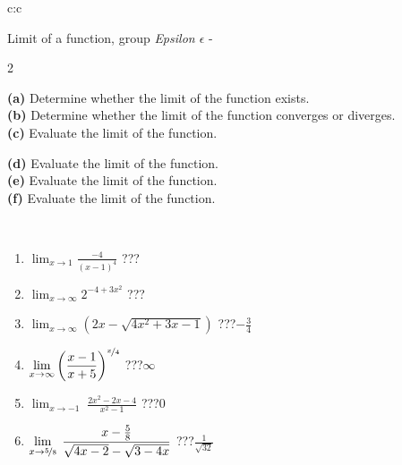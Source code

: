 \documentclass[10pt]{report}
\begin{document}
\newpage
\thispagestyle{empty}
\begin{tabular}{c:c}
\begin{minipage}[c][104.5mm][t]{0.5\linewidth}
\begin{center}
\vspace{5mm}
{\huge Limit of a function, group \textit{Epsilon $\epsilon$} -}\\[5mm]
\begin{minipage}{0.95\linewidth}
\begin{center}
{\small \begin{multicols}{2} \raggedright
\textbf{(a)} Determine whether the limit of the function exists. \\[1mm]
\textbf{(b)} Determine whether the limit of the function converges or diverges. \\[1mm]
\textbf{(c)} Evaluate the limit of the function. \par \columnbreak
\textbf{(d)} Evaluate the limit of the function. \\[1mm]
\textbf{(e)} Evaluate the limit of the function. \\[1mm]
\textbf{(f)} Evaluate the limit of the function. \\[1mm]
\end{multicols}
}
\end{center}
\end{minipage}
\\[1mm]
\begin{minipage}{0.79\linewidth}
\begin{center}
\begin{varwidth}{\linewidth}
\setlength{\itemsep}{0pt}
\begin{enumerate}
\normalsize
\item $\displaystyle\lim_{x\to1}{\frac{-4}{(x-1)^{4}}}$\quad \dotfill\; ???\;\dotfill \quad {}
\item $\displaystyle\lim_{x\to\infty}{2^{-4+3x^2}}$\quad \dotfill\; ???\;\dotfill \quad {}
\item $\displaystyle\lim_{x\to\infty}{\left(2x - \sqrt{4x^2+3x-1}\right)}$\quad \dotfill\; ???\;\dotfill \quad $-\frac{3}{4}$
\item $\displaystyle\lim_{x\to\infty}{\left( \frac{x-1}{x+5} \right)^{\nicefrac{x}{4}}}$\quad \dotfill\; ???\;\dotfill \quad $\infty$
\item $\displaystyle\lim_{x\to -1}{\;\frac{2x^2-2x-4}{x^2-1}}$\quad \dotfill\; ???\;\dotfill \quad $0$
\item $\displaystyle\lim_{x\to \nicefrac{5}{8}}{\;\frac{x-\frac{5}{8}}{\sqrt{4x-2} - \sqrt{3-4x}}}$\quad \dotfill\; ???\;\dotfill \quad $\frac{1}{\sqrt{32}}$

\end{enumerate}
\end{varwidth}
\end{center}
\end{minipage}
\end{center}
\end{minipage}
\end{tabular}
\end{document}
